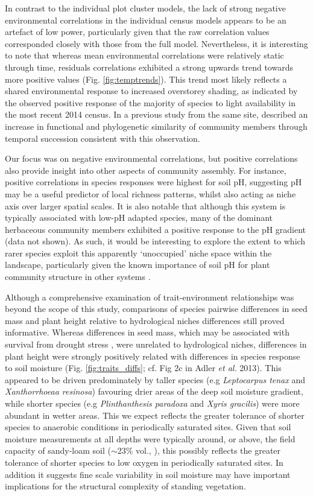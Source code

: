 In contrast to the individual plot cluster models, the lack of strong negative environmental correlations in the individual census models appears to be an artefact of low power, particularly given that the raw correlation values corresponded closely with those from the full model. Nevertheless, it is interesting to note that whereas mean environmental correlations were relatively static through time, residuals correlations exhibited a strong upwards trend towards more positive values (Fig. \ref{fig:temptrends}). This trend most likely reflects a shared environmental response to increased overstorey shading, as indicated by the observed positive response of the majority of species to light availability in the most recent 2014 census. In a previous study from the same site, \citet{Letten2014a} described an increase in functional and phylogenetic similarity of community members through temporal succession consistent with this observation.

Our focus was on negative environmental correlations, but positive correlations also provide insight into other aspects of community assembly. For instance, positive correlations in species responses were highest for soil pH, suggesting pH may be a useful predictor of local richness patterns, whilst also acting as niche axis over larger spatial scales. It is also notable that although this system is typically associated with low-pH adapted species, many of the dominant herbaceous community members exhibited a positive response to the pH gradient (data not shown). As such, it would be interesting to explore the extent to which rarer species exploit this apparently `unoccupied' niche space within the landscape, particularly given the known importance of soil pH for plant community structure in other systems \citep{Laliberte2014}.

Although a comprehensive examination of trait-environment relationships was beyond the scope of this study, comparisons of species pairwise differences in seed mass and plant height relative to hydrological niches differences still proved informative. Whereas differences in seed mass, which may be associated with survival from drought stress \citep{Perez-Harguindeguy2013}, were unrelated to hydrological niches, differences in plant height were strongly positively related with differences in species response to soil moisture (Fig. \ref{fig:traits_diffs}; cf. Fig 2c in Adler \textit{et al.} 2013). This appeared to be driven predominately by taller species (e.g \textit{Leptocarpus tenax} and \textit{Xanthorrhoeaa resinosa}) favouring drier areas of the deep soil moisture gradient, while shorter species (e.g \textit{Plinthanthesis paradoxa} and \textit{Xyris gracilis}) were more abundant in wetter areas. This we expect reflects the greater tolerance of shorter species to anaerobic conditions in periodically saturated sites. Given that soil moisture measurements at all depths were typically around, or above, the field capacity of sandy-loam soil ($\sim$23\% vol., \citealp{atwell1999plants}), this possibly reflects the greater tolerance of shorter species to low oxygen in periodically saturated sites. In addition it suggests fine scale variability in soil moisture may have important implications for the structural complexity of standing vegetation.

